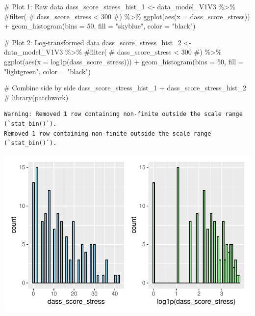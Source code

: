 \documentclass[
  letterpaper,
  DIV=11,
  numbers=noendperiod]{scrartcl}
\newenvironment{Shaded}{\begin{snugshade}}{\end{snugshade}}
\newcommand{\AttributeTok}[1]{\textcolor[rgb]{0.40,0.45,0.13}{#1}}
\newcommand{\CommentTok}[1]{\textcolor[rgb]{0.37,0.37,0.37}{#1}}
\newcommand{\DecValTok}[1]{\textcolor[rgb]{0.68,0.00,0.00}{#1}}
\newcommand{\FunctionTok}[1]{\textcolor[rgb]{0.28,0.35,0.67}{#1}}
\newcommand{\NormalTok}[1]{\textcolor[rgb]{0.00,0.23,0.31}{#1}}
\newcommand{\OtherTok}[1]{\textcolor[rgb]{0.00,0.23,0.31}{#1}}
\newcommand{\SpecialCharTok}[1]{\textcolor[rgb]{0.37,0.37,0.37}{#1}}
\newcommand{\StringTok}[1]{\textcolor[rgb]{0.13,0.47,0.30}{#1}}
\begin{document}
\begin{Shaded}
\begin{Highlighting}[]
\CommentTok{\# Plot 1: Raw data}
\NormalTok{dass\_score\_stress\_hist\_1 }\OtherTok{\textless{}{-}}\NormalTok{ data\_model\_V1V3 }\SpecialCharTok{\%\textgreater{}\%} 
    \CommentTok{\#filter(}
    \CommentTok{\#    dass\_score\_stress \textless{} 300}
    \CommentTok{\#) \%\textgreater{}\% }
    \FunctionTok{ggplot}\NormalTok{(}\FunctionTok{aes}\NormalTok{(}\AttributeTok{x =}\NormalTok{ dass\_score\_stress)) }\SpecialCharTok{+} 
    \FunctionTok{geom\_histogram}\NormalTok{(}\AttributeTok{bins =} \DecValTok{50}\NormalTok{, }\AttributeTok{fill =} \StringTok{"skyblue"}\NormalTok{, }\AttributeTok{color =} \StringTok{"black"}\NormalTok{)}

\CommentTok{\# Plot 2: Log{-}transformed data}
\NormalTok{dass\_score\_stress\_hist\_2 }\OtherTok{\textless{}{-}}\NormalTok{ data\_model\_V1V3 }\SpecialCharTok{\%\textgreater{}\%} 
    \CommentTok{\#filter(}
    \CommentTok{\#    dass\_score\_stress \textless{} 300}
    \CommentTok{\#) \%\textgreater{}\%}
    \FunctionTok{ggplot}\NormalTok{(}\FunctionTok{aes}\NormalTok{(}\AttributeTok{x =} \FunctionTok{log1p}\NormalTok{(dass\_score\_stress))) }\SpecialCharTok{+} 
    \FunctionTok{geom\_histogram}\NormalTok{(}\AttributeTok{bins =} \DecValTok{50}\NormalTok{, }\AttributeTok{fill =} \StringTok{"lightgreen"}\NormalTok{, }\AttributeTok{color =} \StringTok{"black"}\NormalTok{)}

\CommentTok{\# Combine side by side}
\NormalTok{dass\_score\_stress\_hist\_1 }\SpecialCharTok{+}\NormalTok{ dass\_score\_stress\_hist\_2 }\CommentTok{\# library(patchwork)}
\end{Highlighting}
\end{Shaded}

\begin{verbatim}
Warning: Removed 1 row containing non-finite outside the scale range (`stat_bin()`).
Removed 1 row containing non-finite outside the scale range (`stat_bin()`).
\end{verbatim}

\includegraphics{Outcomes_V1V2V3_files/figure-pdf/dass_score_stress_1-1.pdf}
\end{document}

